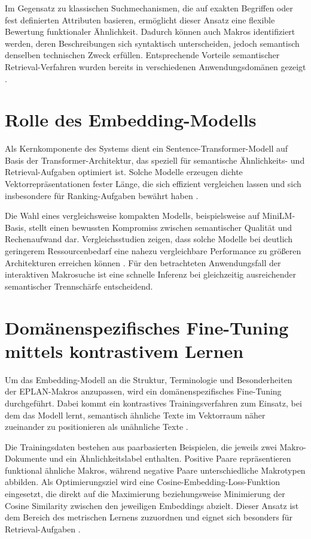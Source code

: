 Im Gegensatz zu klassischen Suchmechanismen, die auf exakten Begriffen oder fest definierten Attributen basieren, ermöglicht dieser Ansatz eine flexible Bewertung funktionaler Ähnlichkeit. Dadurch können auch Makros identifiziert werden, deren Beschreibungen sich syntaktisch unterscheiden, jedoch semantisch denselben technischen Zweck erfüllen. Entsprechende Vorteile semantischer Retrieval-Verfahren wurden bereits in verschiedenen Anwendungsdomänen gezeigt \cite{tao_llms_2025}.

\section{Rolle des Embedding-Modells}

Als Kernkomponente des Systems dient ein Sentence-Transformer-Modell auf Basis der Transformer-Architektur, das speziell für semantische Ähnlichkeits- und Retrieval-Aufgaben optimiert ist. Solche Modelle erzeugen dichte Vektorrepräsentationen fester Länge, die sich effizient vergleichen lassen und sich insbesondere für Ranking-Aufgaben bewährt haben \cite{khosla_comparative_2025}.

Die Wahl eines vergleichsweise kompakten Modells, beispielsweise auf MiniLM-Basis, stellt einen bewussten Kompromiss zwischen semantischer Qualität und Rechenaufwand dar. Vergleichsstudien zeigen, dass solche Modelle bei deutlich geringerem Ressourcenbedarf eine nahezu vergleichbare Performance zu größeren Architekturen erreichen können \cite{red_compare_2024}. Für den betrachteten Anwendungsfall der interaktiven Makrosuche ist eine schnelle Inferenz bei gleichzeitig ausreichender semantischer Trennschärfe entscheidend.

\section{Domänenspezifisches Fine-Tuning mittels kontrastivem Lernen}

Um das Embedding-Modell an die Struktur, Terminologie und Besonderheiten der EPLAN-Makros anzupassen, wird ein domänenspezifisches Fine-Tuning durchgeführt. Dabei kommt ein kontrastives Trainingsverfahren zum Einsatz, bei dem das Modell lernt, semantisch ähnliche Texte im Vektorraum näher zueinander zu positionieren als unähnliche Texte \cite{parthasarathy_ultimate_2024}.

Die Trainingsdaten bestehen aus paarbasierten Beispielen, die jeweils zwei Makro-Dokumente und ein Ähnlichkeitslabel enthalten. Positive Paare repräsentieren funktional ähnliche Makros, während negative Paare unterschiedliche Makrotypen abbilden. Als Optimierungsziel wird eine Cosine-Embedding-Loss-Funktion eingesetzt, die direkt auf die Maximierung beziehungsweise Minimierung der Cosine Similarity zwischen den jeweiligen Embeddings abzielt. Dieser Ansatz ist dem Bereich des metrischen Lernens zuzuordnen und eignet sich besonders für Retrieval-Aufgaben \cite{parthasarathy_ultimate_2024}.

